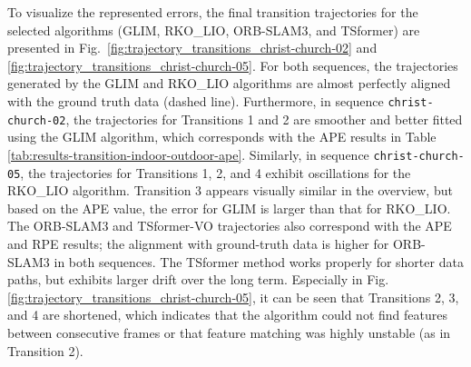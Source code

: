 \documentclass[pdflatex,sn-mathphys-num]{sn-jnl}
\theoremstyle{thmstyleone}%
\theoremstyle{thmstyletwo}%
\theoremstyle{thmstylethree}%
\begin{document}
To visualize the represented errors, the final transition trajectories for the selected algorithms (GLIM, RKO\_LIO, ORB-SLAM3, and TSformer) are presented in Fig.~\ref{fig:trajectory_transitions_christ-church-02} and \ref{fig:trajectory_transitions_christ-church-05}. For both sequences, the trajectories generated by the GLIM and RKO\_LIO algorithms are almost perfectly aligned with the ground truth data (dashed line). Furthermore, in sequence \texttt{christ-church-02}, the trajectories for Transitions 1 and 2 are smoother and better fitted using the GLIM algorithm, which corresponds with the APE results in Table \ref{tab:results-transition-indoor-outdoor-ape}. Similarly, in sequence \texttt{christ-church-05}, the trajectories for Transitions 1, 2, and 4 exhibit oscillations for the RKO\_LIO algorithm. Transition 3 appears visually similar in the overview, but based on the APE value, the error for GLIM is larger than that for RKO\_LIO. The ORB-SLAM3 and TSformer-VO trajectories also correspond with the APE and RPE results; the alignment with ground-truth data is higher for ORB-SLAM3 in both sequences. The TSformer method works properly for shorter data paths, but exhibits larger drift over the long term. Especially in Fig. \ref{fig:trajectory_transitions_christ-church-05}, it can be seen that Transitions 2, 3, and 4 are shortened, which indicates that the algorithm could not find features between consecutive frames or that feature matching was highly unstable (as in Transition 2).

\end{document}
